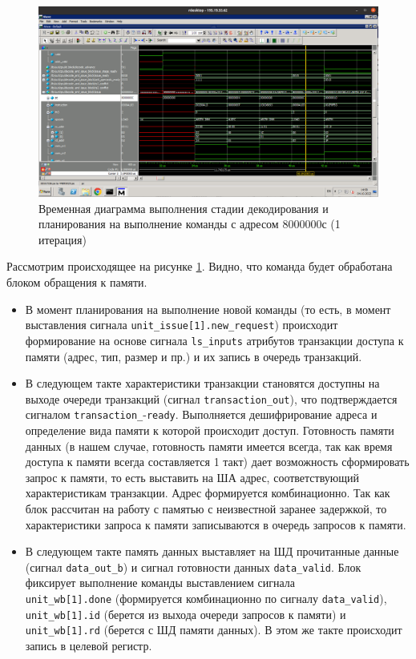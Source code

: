 \begin{figure}[h!p]
	\centering
	\includegraphics[width = \linewidth]{img/var4task4.png}
	\caption{Временная диаграмма выполнения стадии декодирования и планирования на выполнение команды с адресом 8000000с (1 итерация)}
	\label{var4task4}
\end{figure}

Рассмотрим происходящее на рисунке \ref{var4task4}. Видно, что команда будет обработана блоком обращения к памяти.
\begin{itemize}
	\item В момент планирования на выполнение новой команды (то есть, в момент выставления сигнала \verb|unit_issue[1].new_request|) происходит формирование на основе сигнала \verb|ls_inputs| атрибутов транзакции доступа к памяти (адрес, тип, размер и пр.) и их запись в очередь транзакций.
	\item В следующем такте характеристики транзакции становятся доступны на выходе очереди транзакций (сигнал \verb|transaction_out|), что подтверждается сигналом \verb|transaction_|-\verb|ready|. Выполняется дешифрирование адреса и определение вида памяти к которой происходит доступ. Готовность памяти данных (в нашем случае, готовность памяти имеется всегда, так как время доступа к памяти всегда составляется 1 такт) дает возможность сформировать запрос к памяти, то есть выставить на ША адрес, соответствующий характеристикам транзакции. Адрес формируется комбинационно. Так как блок рассчитан на работу с памятью с неизвестной заранее задержкой, то характеристики запроса к памяти записываются в очередь запросов к памяти.
	\item В следующем такте память данных выставляет на ШД прочитанные данные (сигнал \verb|data_out_b|) и сигнал готовности данных \verb|data_valid|. Блок фиксирует выполнение команды выставлением сигнала \\
	\verb|unit_wb[1].done| (формируется комбинационно по сигналу \verb|data_valid|), \verb|unit_wb[1].id| (берется из выхода очереди запросов к памяти) и \verb|unit_wb[1].rd| (берется с ШД памяти данных). В этом же такте происходит запись в целевой регистр. 
\end{itemize}

